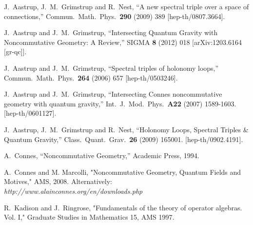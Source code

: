 \documentclass[12pt]{article}
\begin{document}
\begin{thebibliography}{99}
  J.~Aastrup, J.~M.~Grimstrup and R.~Nest,
  ``A new spectral triple over a space of connections,''
  Commun.\ Math.\ Phys.\  {\bf 290} (2009) 389
  [hep-th/0807.3664].





  J.~Aastrup and J.~M.~Grimstrup,
  ``Intersecting Quantum Gravity with Noncommutative Geometry: A Review,''
  SIGMA {\bf 8} (2012) 018
  [arXiv:1203.6164 [gr-qc]].








  J.~Aastrup and J.~M.~Grimstrup,
  ``Spectral triples of holonomy loops,''
  Commun.\ Math.\ Phys.\  {\bf 264} (2006) 657
  [hep-th/0503246].


  J.~Aastrup and J.~M.~Grimstrup,
  ``Intersecting Connes noncommutative geometry with quantum gravity,''
  Int.\ J.\ Mod.\ Phys.\  {\bf A22 } (2007)  1589-1603.
  [hep-th/0601127].


















  J.~Aastrup, J.~M.~Grimstrup and R.~Nest,
  ``Holonomy Loops, Spectral Triples \& Quantum Gravity,''
  Class.\ Quant.\ Grav.\  {\bf 26 } (2009)  165001.
  [hep-th/0902.4191].
  
  









A.~Connes,
``Noncommutative Geometry,'' Academic Press, 1994.

A.~Connes and M. Marcolli,
"Noncommutative Geometry, Quantum Fields and Motives," AMS, 2008. Alternatively: \textit{http://www.alainconnes.org/en/downloads.php} 


   R.~Kadison and J.~Ringrose,
     "Fundamentals of the theory of operator algebras. {V}ol. {I},"
   Graduate Studies in Mathematics 15, AMS 1997. 
 

\end{thebibliography}
\end{document}
